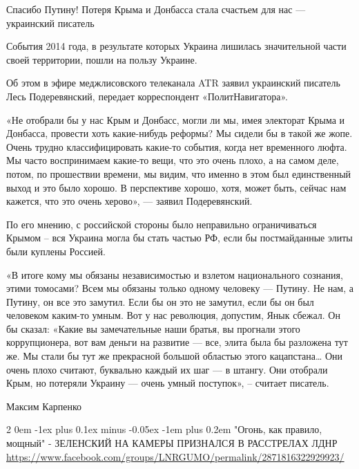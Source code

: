 \documentclass[a4paper,11pt]{extreport}
\makeatletter
\renewcommand\subsection{%
  \clearpage
    \@startsection{subsection}%
    {2}%
    {0em}%
    {-1ex plus 0.1ex minus -0.05ex}%
    {-1em plus 0.2em}%
    {\scshape\bfseries\Large}%
}
\makeatother
\begin{document}

Спасибо Путину! Потеря Крыма и Донбасса стала счастьем для нас --- украинский писатель

События 2014 года, в результате которых Украина лишилась значительной части
своей территории, пошли на пользу Украине.

Об этом в эфире меджлисовского телеканала ATR заявил украинский писатель Лесь
Подеревянский, передает корреспондент «ПолитНавигатора».

«Не отобрали бы у нас Крым и Донбасс, могли ли мы, имея электорат Крыма и
Донбасса, провести хоть какие-нибудь реформы? Мы сидели бы в такой же жопе.
Очень трудно классифицировать какие-то события, когда нет временного люфта. Мы
часто воспринимаем какие-то вещи, что это очень плохо, а на самом деле, потом,
по прошествии времени, мы видим, что именно в этом был единственный выход и это
было хорошо. В перспективе хорошо, хотя, может быть, сейчас нам кажется, что
это очень херово», --- заявил Подеревянский.

По его мнению, с российской стороны было неправильно ограничиваться Крымом –
вся Украина могла бы стать частью РФ, если бы постмайданные элиты были куплены
Россией.

«В итоге кому мы обязаны независимостью и взлетом национального сознания, этими
томосами? Всем мы обязаны только одному человеку --- Путину. Не нам, а Путину, он
все это замутил. Если бы он это не замутил, если бы он был человеком каким-то
умным. Вот у нас революция, допустим, Янык сбежал. Он бы сказал: «Какие вы
замечательные наши братья, вы прогнали этого коррупционера, вот вам деньги на
развитие --- все, элита была бы разложена тут же. Мы стали бы тут же прекрасной
большой областью этого кацапстана… Они очень плохо считают, буквально каждый их
шаг --- в штангу. Они отобрали Крым, но потеряли Украину --- очень умный поступок»,
– считает писатель.

Максим Карпенко
  
 
 

\subsection{"Огонь, как правило, мощный" - ЗЕЛЕНСКИЙ НА КАМЕРЫ ПРИЗНАЛСЯ В РАССТРЕЛАХ ЛДНР}
\label{sec:24_07_2020.fb.lnr.7}
\url{https://www.facebook.com/groups/LNRGUMO/permalink/2871816322929923/}
\end{document}
